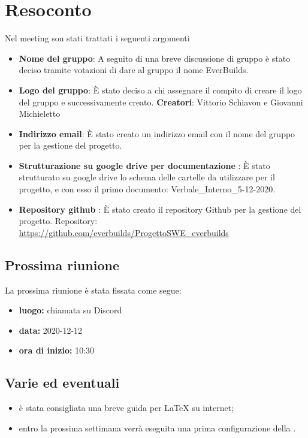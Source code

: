 \section{Resoconto}
Nel meeting son stati trattati i seguenti argomenti
	\begin{itemize}
		\item\textbf{Nome del gruppo}:
		A seguito di una breve discussione di gruppo è stato deciso tramite votazioni di dare al gruppo il nome EverBuilds.
		\item\textbf{Logo del gruppo}:
		È stato deciso a chi assegnare il compito di creare il logo del gruppo e successivamente creato.
		\textbf{Creatori}: Vittorio Schiavon e Giovanni Michieletto
		\item\textbf{ Indirizzo email}:
		È stato creato un indirizzo email con il nome del gruppo per la gestione del progetto.
		\item\textbf{ Strutturazione su google drive per documentazione }:
		È stato strutturato su google drive lo schema delle cartelle da utilizzare per il progetto, e con esso il primo documento: Verbale\_Interno\_5-12-2020.
		\item\textbf{ Repository github }:
		È stato creato il repository Github per la gestione del progetto.
		Repository: \url{https://github.com/everbuilds/ProgettoSWE_everbuilds}
	\end{itemize}

\subsection{Prossima riunione}
La prossima riunione è stata fissata come segue:
\begin{itemize}
	\item \textbf{luogo:} chiamata su Discord
	\item \textbf{data:} 2020-12-12
	\item \textbf{ora di inizio:} 10:30
\end{itemize}


\subsection{Varie ed eventuali}
\begin{itemize}

	\item è stata consigliata una breve guida per \LaTeX{} su internet;
	\item entro la prossima settimana verrà eseguita una prima configurazione della .
\end{itemize}


